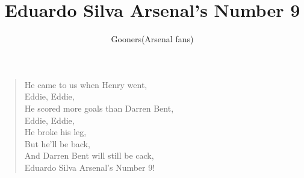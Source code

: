\documentclass[a4paper,12pt]{article}
\title{Eduardo Silva Arsenal's Number 9}
\author{Gooners(Arsenal fans)}
\date{}
\begin{document}
	
	\maketitle
	
	\begin{verse}
		
		He came to us when Henry went, \\
		Eddie, Eddie, \\
		He scored more goals than Darren Bent, \\
		Eddie, Eddie, \\
		He broke his leg, \\
		But he'll be back, \\
		And Darren Bent will still be cack, \\
		Eduardo Silva Arsenal's Number 9!
		
	\end{verse}
	
\end{document}
